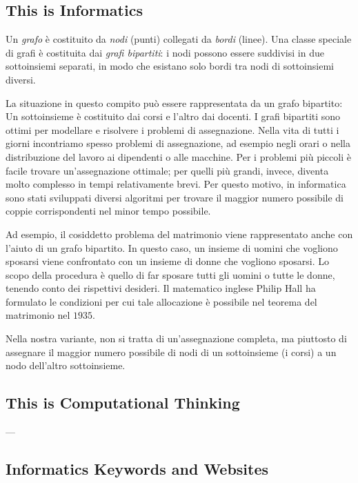 \documentclass[a4paper,11pt]{report}
\newcommand{\taskGraphicsFolder}{..}
\begin{document}
\subsection*{This is Informatics}

Un \emph{grafo} è costituito da \emph{nodi} (punti) collegati da \emph{bordi} (linee). Una classe speciale di grafi è costituita dai \emph{grafi bipartiti}: i nodi possono essere suddivisi in due sottoinsiemi separati, in modo che esistano solo bordi tra nodi di sottoinsiemi diversi.

{\centering%
\par}

La situazione in questo compito può essere rappresentata da un grafo bipartito: Un sottoinsieme è costituito dai corsi e l’altro dai docenti. I grafi bipartiti sono ottimi per modellare e risolvere i problemi di assegnazione. Nella vita di tutti i giorni incontriamo spesso problemi di assegnazione, ad esempio negli orari o nella distribuzione del lavoro ai dipendenti o alle macchine. Per i problemi più piccoli è facile trovare un’assegnazione ottimale; per quelli più grandi, invece, diventa molto complesso in tempi relativamente brevi. Per questo motivo, in informatica sono stati sviluppati diversi algoritmi per trovare il maggior numero possibile di coppie corrispondenti nel minor tempo possibile.

Ad esempio, il cosiddetto problema del matrimonio viene rappresentato anche con l’aiuto di un grafo bipartito. In questo caso, un insieme di uomini che vogliono sposarsi viene confrontato con un insieme di donne che vogliono sposarsi. Lo scopo della procedura è quello di far sposare tutti gli uomini o tutte le donne, tenendo conto dei rispettivi desideri. Il matematico inglese Philip Hall ha formulato le condizioni per cui tale allocazione è possibile nel teorema del matrimonio nel $1935$.

Nella nostra variante, non si tratta di un’assegnazione completa, ma piuttosto di assegnare il maggior numero possibile di nodi di un sottoinsieme (i corsi) a un nodo dell’altro sottoinsieme.


\subsection*{This is Computational Thinking}

—


\subsection*{Informatics Keywords and Websites}
\end{document}
